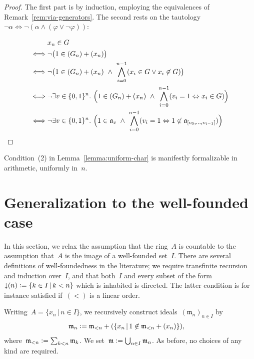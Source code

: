 \documentclass[envcountsect,envcountsame,runningheads]{llncs}
\newcommand{\aaa}{\mathfrak{a}}
\newcommand{\mmm}{\mathfrak{m}}
\newcommand{\defeq}{\vcentcolon=}
\renewcommand{\_}{\mathpunct{.}\,}
\begin{document}
\begin{proof}The first part is by induction, employing the equivalences of
Remark~\ref{rem:via-generators}. The second rests on the tautology
$\neg\alpha \Longleftrightarrow \neg(\alpha \wedge (\varphi \vee \neg\varphi))$:

\vspace*{-1.2em}\small
\begin{align*}
  &\mathrel{\phantom{\Longleftrightarrow}} x_n \in G \\
  &\Longleftrightarrow \neg\bigl(1 \in (G_n) + (x_n)\bigr) \\
  &\Longleftrightarrow \neg\bigl(1 \in (G_n) + (x_n) \ \wedge\ \bigwedge_{i=0}^{n-1} (x_i \in G \vee x_i \not\in G)\bigr) \\
  &\Longleftrightarrow \neg\exists v \in \{0,1\}^n\_
    \Bigl(1 \in (G_n) + (x_n) \ \wedge\ \bigwedge_{i=0}^{n-1} (v_i = 1
    \Leftrightarrow x_i \in G)\Bigr) \\
  &\Longleftrightarrow \neg\exists v \in \{0,1\}^n\_
    \Bigl(1 \in \aaa_v \ \wedge\ \bigwedge_{i=0}^{n-1} (v_i = 1
    \Leftrightarrow 1 \not\in \aaa_{[v_0,\ldots,v_{i-1}]})\Bigr) %
\end{align*}
\end{proof}

Condition~(2) in Lemma~\ref{lemma:uniform-char} is manifestly formalizable in
arithmetic, uniformly in~$n$.


\section{Generalization to the well-founded case}

In this section, we relax the assumption that the ring~$A$ is countable to the
assumption that~$A$ is the image of a well-founded set~$I$. There are several
definitions of well-foundedness in the literature; we require
transfinite recursion and induction over~$I$, and that both~$I$ and every subset
of the form~${{\downarrow}(n)} \defeq \{k \in I \,|\, k < n\}$ which is inhabited is directed. The
latter condition is for instance satisfied if~$({<})$ is a linear order.

Writing~$A = \{ x_n \,|\, n \in I \}$, we recursively construct
ideals~$(\mmm_n)_{n \in I}$ by
\begin{align*}
  \mmm_n &\defeq \mmm_{<n} + (\{ x_n \,|\, 1 \not\in \mmm_{<n} + (x_n) \}),
\end{align*}
where~$\mmm_{<n} \defeq \sum_{k < n} \mmm_k$. We set~$\mmm \defeq \bigcup_{n
\in I} \mmm_n$. As before, no choices of any kind are required.
\end{document}
